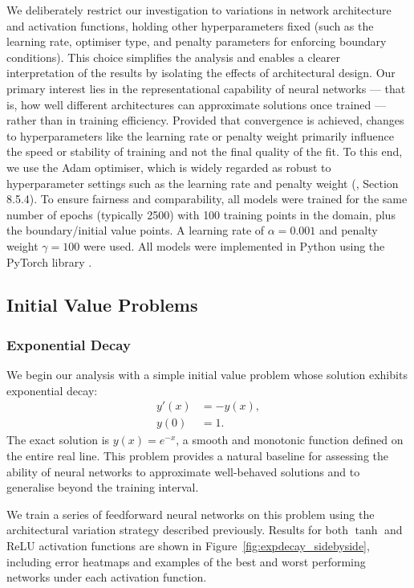 We deliberately restrict our investigation to variations in network architecture and activation 
functions, holding other hyperparameters fixed (such as the learning rate, optimiser type, and 
penalty parameters for enforcing boundary conditions). This choice simplifies the analysis and 
enables a clearer interpretation of the results by isolating the effects of architectural design. 
Our primary interest lies in the representational capability of neural networks — that is, how 
well different architectures can approximate solutions once trained — rather than in training 
efficiency. Provided that convergence is achieved, changes to hyperparameters like the learning 
rate or penalty weight primarily influence the speed or stability of training and not the final quality 
of the fit. To this end, we use the Adam optimiser, which is widely regarded as robust to 
hyperparameter settings such as the learning rate and penalty weight (\cite{goodfellow2016deep},
Section 8.5.4). To ensure fairness and comparability, all models were trained for the same 
number of epochs (typically 2500) with 100 training points in the domain, plus the 
boundary/initial value points. A learning rate of $\alpha = 0.001$ and penalty weight 
$\gamma = 100$ were used. All 
models were implemented in Python using the PyTorch library \cite{paszke2017automatic}.


\subsection{Initial Value Problems}\label{sec:IVPs}

\subsubsection{Exponential Decay}

We begin our analysis with a simple initial value problem whose solution exhibits exponential decay:
\[
\begin{aligned}
    y'(x) &= -y(x), \\
    y(0) &= 1.
\end{aligned}
\]
The exact solution is \( y(x) = e^{-x} \), a smooth and monotonic function defined on the entire real
line. This problem provides a natural baseline for assessing the ability of neural networks to 
approximate well-behaved solutions and to generalise beyond the training interval.

We train a series of feedforward neural networks on this problem using the architectural variation 
strategy described previously. Results for 
both \(\tanh\) and ReLU activation functions are shown in Figure~\ref{fig:expdecay_sidebyside}, 
including error heatmaps and examples of the best and worst performing networks under each 
activation function.

